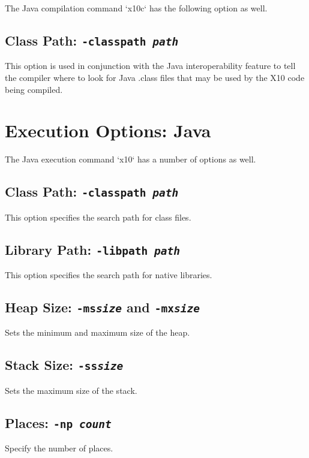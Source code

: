 The Java compilation command \xcd`x10c` has the following option as well. 

\subsection{Class Path: {\tt -classpath {\em path}}}

This option is used in conjunction with the Java interoperability
feature to tell the compiler where to look for Java .class files that
may be used by the X10 code being compiled.


\section{Execution Options: Java}

The Java execution command \xcd`x10` has a number of options as well. 

\subsection{Class Path: {\tt -classpath {\em path}}}

This option specifies the search path for class files. 

\subsection{Library Path: {\tt -libpath {\em path}}}

This option specifies the search path for native libraries.

\subsection{Heap Size: {\tt -ms{\em size}} and {\tt -mx{\em size}}}

Sets the minimum and maximum size of the heap. 

\subsection{Stack Size: {\tt -ss{\em size}}}

Sets the maximum size of the stack. 

\subsection{Places: {\tt -np {\em count}}}

Specify the number of places.

